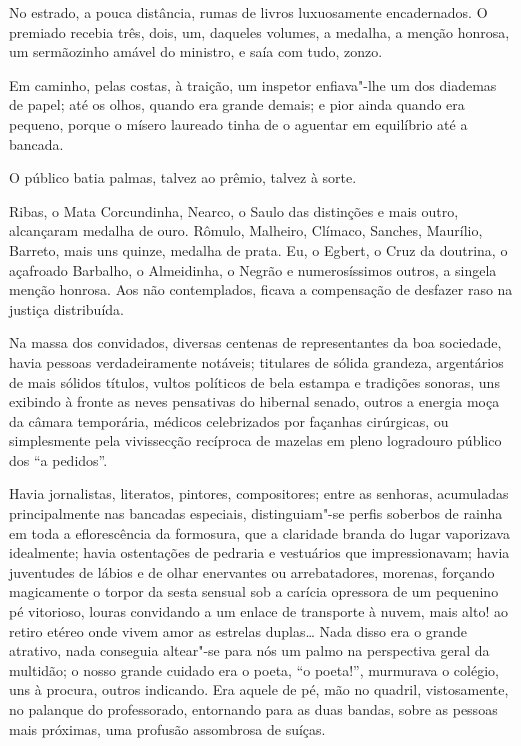 No estrado, a pouca distância, rumas de livros luxuosamente
encadernados. O premiado recebia três, dois, um, daqueles volumes, a
medalha, a menção honrosa, um sermãozinho amável do ministro, e saía
com tudo, zonzo. 

Em caminho, pelas costas, à traição, um inspetor
enfiava"-lhe um dos diademas de papel; até os olhos, quando era grande
demais; e pior ainda quando era pequeno, porque o mísero laureado tinha
de o aguentar em equilíbrio até a bancada. 

O público batia palmas, talvez ao prêmio, talvez à sorte. 

Ribas, o Mata Corcundinha, Nearco, o
Saulo das distinções e mais outro, alcançaram medalha de ouro. Rômulo,
Malheiro, Clímaco, Sanches, Maurílio, Barreto, mais uns quinze, medalha
de prata. Eu, o Egbert, o Cruz da doutrina, o açafroado Barbalho, o
Almeidinha, o Negrão e numerosíssimos outros, a singela menção honrosa.
Aos não contemplados, ficava a compensação de desfazer raso na justiça
distribuída. 

Na massa dos convidados, diversas centenas de
representantes da boa sociedade, havia pessoas verdadeiramente
notáveis; titulares de sólida grandeza, argentários de mais sólidos
títulos, vultos políticos de bela estampa e tradições sonoras, uns
exibindo à fronte as neves pensativas do hibernal senado, outros a
energia moça da câmara temporária, médicos celebrizados por façanhas
cirúrgicas, ou simplesmente pela vivissecção recíproca de mazelas em
pleno logradouro público dos ``a pedidos''. 

Havia jornalistas, literatos,
pintores, compositores; entre as senhoras, acumuladas principalmente
nas bancadas especiais, distinguiam"-se perfis soberbos de rainha em
toda a eflorescência da formosura, que a claridade branda do lugar
vaporizava idealmente; havia ostentações de pedraria e vestuários que
impressionavam; havia juventudes de lábios e de olhar enervantes ou
arrebatadores, morenas, forçando magicamente o torpor da sesta sensual
sob a carícia opressora de um pequenino pé vitorioso, louras convidando
a um enlace de transporte à nuvem, mais alto! ao retiro etéreo onde
vivem amor as estrelas duplas\ldots{} Nada disso era o grande atrativo, nada
conseguia altear"-se para nós um palmo na perspectiva geral da
multidão; o nosso grande cuidado era o poeta, ``o poeta!'', murmurava o
colégio, uns à procura, outros indicando. Era aquele de pé, mão no
quadril, vistosamente, no palanque do professorado, entornando para as
duas bandas, sobre as pessoas mais próximas, uma profusão assombrosa de
suíças. 

